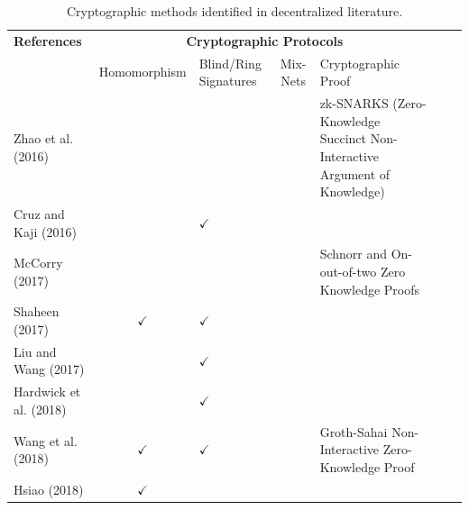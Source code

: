 \documentclass[../access.tex]{subfiles}
\begin{document}
    \begin{table}[htbp]
        \caption{Cryptographic methods identified in decentralized literature.}
            \begin{adjustwidth}{-2cm}{}
                \begin{tabular}{m{4.4cm} c >{\centering\arraybackslash}m{1.7cm} c >{\centering\arraybackslash}m{6cm} >{\centering\arraybackslash} m{1.0cm} >{\centering\arraybackslash}m{14.9cm}} %
                    \toprule
                    \multirow{3.5}{=}{\textbf{\footnotesize{References}}} & \multicolumn{4}{c}{\textbf{Cryptographic Protocols}} \\
                    \cline{2-5}
                    \vspace{0.5cm}
                    \multirow{2}{=}{} & \parbox[m]{1.7cm}{\footnotesize{Homomorphism}} & \footnotesize{Blind/Ring Signatures} & \footnotesize{Mix-Nets} & \footnotesize{Cryptographic Proof} \\
                    \hline
                    \footnotesize{Zhao et al. (2016) \cite{Zhao2016}} & {} & {} & {} & \footnotesize{zk-SNARKS (Zero-Knowledge Succinct Non-Interactive Argument of Knowledge)} \\
                    \hline
                    \footnotesize{Cruz and Kaji (2016) \cite{Cruz2016}} & {} & $ \checkmark $ & {} & {} \\
                    \hline
                    \footnotesize{McCorry (2017) \cite{McCorry2017}} & {} & {} & {} & \footnotesize{Schnorr and On-out-of-two Zero Knowledge Proofs} \\
                    \hline
                    \footnotesize{Shaheen (2017) \cite{Shaheen2017}} & $ \checkmark $ & $ \checkmark $ & {} & {} \\
                    \hline
                    \footnotesize{Liu and Wang (2017) \cite{Liu2017}} & {} & $ \checkmark $ & {} & {} \\
                    \hline
                    \footnotesize{Hardwick et al. (2018) \cite{Hardwick2018}} & {} & $ \checkmark $ & {} & {} \\
                    \hline
                    \footnotesize{Wang et al. (2018) \cite{Wang2018}} & $ \checkmark $ & $ \checkmark $ & {} & \footnotesize{Groth-Sahai Non-Interactive Zero-Knowledge Proof} \\
                    \hline
                    \footnotesize{Hsiao (2018) \cite{Hsiao2018}} & $ \checkmark $ & {} & {} & {} \\

\end{tabular}
\end{adjustwidth}
\end{table}
\end{document}
